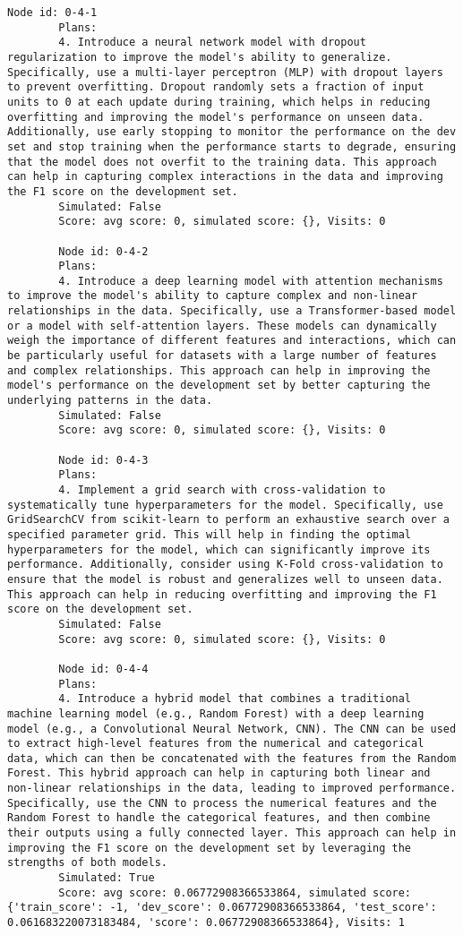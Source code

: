 \begin{lstlisting}[style=txtfile]
		Node id: 0-4-1
		Plans: 
		4. Introduce a neural network model with dropout regularization to improve the model's ability to generalize. Specifically, use a multi-layer perceptron (MLP) with dropout layers to prevent overfitting. Dropout randomly sets a fraction of input units to 0 at each update during training, which helps in reducing overfitting and improving the model's performance on unseen data. Additionally, use early stopping to monitor the performance on the dev set and stop training when the performance starts to degrade, ensuring that the model does not overfit to the training data. This approach can help in capturing complex interactions in the data and improving the F1 score on the development set.
		Simulated: False
		Score: avg score: 0, simulated score: {}, Visits: 0

		Node id: 0-4-2
		Plans: 
		4. Introduce a deep learning model with attention mechanisms to improve the model's ability to capture complex and non-linear relationships in the data. Specifically, use a Transformer-based model or a model with self-attention layers. These models can dynamically weigh the importance of different features and interactions, which can be particularly useful for datasets with a large number of features and complex relationships. This approach can help in improving the model's performance on the development set by better capturing the underlying patterns in the data.
		Simulated: False
		Score: avg score: 0, simulated score: {}, Visits: 0

		Node id: 0-4-3
		Plans: 
		4. Implement a grid search with cross-validation to systematically tune hyperparameters for the model. Specifically, use GridSearchCV from scikit-learn to perform an exhaustive search over a specified parameter grid. This will help in finding the optimal hyperparameters for the model, which can significantly improve its performance. Additionally, consider using K-Fold cross-validation to ensure that the model is robust and generalizes well to unseen data. This approach can help in reducing overfitting and improving the F1 score on the development set.
		Simulated: False
		Score: avg score: 0, simulated score: {}, Visits: 0

		Node id: 0-4-4
		Plans: 
		4. Introduce a hybrid model that combines a traditional machine learning model (e.g., Random Forest) with a deep learning model (e.g., a Convolutional Neural Network, CNN). The CNN can be used to extract high-level features from the numerical and categorical data, which can then be concatenated with the features from the Random Forest. This hybrid approach can help in capturing both linear and non-linear relationships in the data, leading to improved performance. Specifically, use the CNN to process the numerical features and the Random Forest to handle the categorical features, and then combine their outputs using a fully connected layer. This approach can help in improving the F1 score on the development set by leveraging the strengths of both models.
		Simulated: True
		Score: avg score: 0.06772908366533864, simulated score: {'train_score': -1, 'dev_score': 0.06772908366533864, 'test_score': 0.061683220073183484, 'score': 0.06772908366533864}, Visits: 1


\end{lstlisting}
